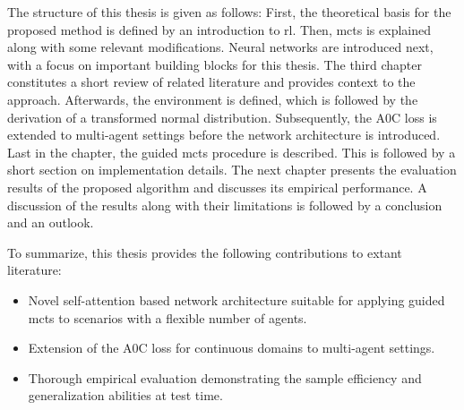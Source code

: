 The structure of this thesis is given as follows: First, the theoretical basis for the proposed method is defined by an introduction to \gls{rl}. Then, \gls{mcts} is explained along with some relevant modifications. Neural networks are introduced next, with a focus on important building blocks for this thesis. The third chapter constitutes a short review of related literature and provides context to the approach. Afterwards, the environment is defined, which is followed by the derivation of a transformed normal distribution. Subsequently, the A0C loss is extended to multi-agent settings before the network architecture is introduced. Last in the chapter, the guided \gls{mcts} procedure is described. This is followed by a short section on implementation details. The next chapter presents the evaluation results of the proposed algorithm and discusses its empirical performance. A discussion of the results along with their limitations is followed by a conclusion and an outlook.

To summarize, this thesis provides the following contributions to extant literature:
\begin{itemize}
    \item Novel self-attention based network architecture suitable for applying guided \gls{mcts} to scenarios with a flexible number of agents.
    \item Extension of the A0C loss for continuous domains to multi-agent settings.
    \item Thorough empirical evaluation demonstrating the sample efficiency and generalization abilities at test time.
\end{itemize}